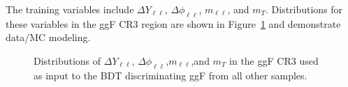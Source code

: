 The training variables include $\Delta Y_{\ell\ell}$, $\Delta \phi_{\ell\ell}$, $m_{\ell\ell}$, and $m_T$. Distributions for these variables in the ggF CR3 region are shown in Figure~\ref{fig:ggFCR3} and demonstrate data/MC modeling.
\begin{figure}[!h]
  \hfill
  \hfill
  \hfill
  \hfill
{\caption{Distributions of $\Delta Y_{\ell\ell}$, $\Delta \phi_{\ell\ell}$,$m_{\ell\ell}$,and $m_T$ in the ggF CR3 used as input to the BDT discriminating ggF from all other samples.
\label{fig:ggFCR3}}}
\end{figure} 

